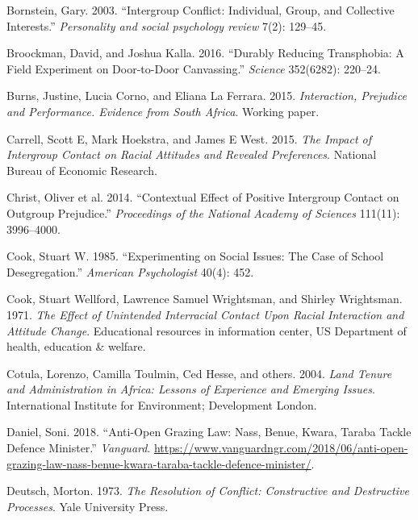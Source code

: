 \documentclass[11pt]{article}
\begin{document}
\begin{cslreferences}
\leavevmode\hypertarget{ref-bornstein2003intergroup}{}%
Bornstein, Gary. 2003. ``Intergroup Conflict: Individual, Group, and
Collective Interests.'' \emph{Personality and social psychology review}
7(2): 129--45.

\leavevmode\hypertarget{ref-broockman2016durably}{}%
Broockman, David, and Joshua Kalla. 2016. ``Durably Reducing
Transphobia: A Field Experiment on Door-to-Door Canvassing.''
\emph{Science} 352(6282): 220--24.

\leavevmode\hypertarget{ref-burns2015interaction}{}%
Burns, Justine, Lucia Corno, and Eliana La Ferrara. 2015.
\emph{Interaction, Prejudice and Performance. Evidence from South
Africa}. Working paper.

\leavevmode\hypertarget{ref-carrell2015impact}{}%
Carrell, Scott E, Mark Hoekstra, and James E West. 2015. \emph{The
Impact of Intergroup Contact on Racial Attitudes and Revealed
Preferences}. National Bureau of Economic Research.

\leavevmode\hypertarget{ref-christ2014contextual}{}%
Christ, Oliver et al. 2014. ``Contextual Effect of Positive Intergroup
Contact on Outgroup Prejudice.'' \emph{Proceedings of the National
Academy of Sciences} 111(11): 3996--4000.

\leavevmode\hypertarget{ref-cook1985experimenting}{}%
Cook, Stuart W. 1985. ``Experimenting on Social Issues: The Case of
School Desegregation.'' \emph{American Psychologist} 40(4): 452.

\leavevmode\hypertarget{ref-cook1971race}{}%
Cook, Stuart Wellford, Lawrence Samuel Wrightsman, and Shirley
Wrightsman. 1971. \emph{The Effect of Unintended Interracial Contact
Upon Racial Interaction and Attitude Change}. Educational resources in
information center, US Department of health, education \& welfare.

\leavevmode\hypertarget{ref-cotula2004land}{}%
Cotula, Lorenzo, Camilla Toulmin, Ced Hesse, and others. 2004.
\emph{Land Tenure and Administration in Africa: Lessons of Experience
and Emerging Issues}. International Institute for Environment;
Development London.

\leavevmode\hypertarget{ref-daniel2018anti}{}%
Daniel, Soni. 2018. ``Anti-Open Grazing Law: Nass, Benue, Kwara, Taraba
Tackle Defence Minister.'' \emph{Vanguard}.
\url{https://www.vanguardngr.com/2018/06/anti-open-grazing-law-nass-benue-kwara-taraba-tackle-defence-minister/}.

\leavevmode\hypertarget{ref-deutsch1973resolution}{}%
Deutsch, Morton. 1973. \emph{The Resolution of Conflict: Constructive
and Destructive Processes}. Yale University Press.


\end{cslreferences}
\end{document}
